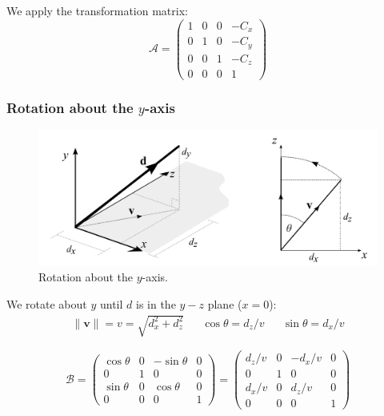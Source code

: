 \documentclass[11pt]{article}
\begin{document}
We apply the transformation matrix:
\[
  \mathcal{A} =
  \begin{pmatrix}
    1 & 0 & 0 & -C_x \\
    0 & 1 & 0 & -C_y \\
    0 & 0 & 1 & -C_z \\
    0 & 0 & 0 & 1
  \end{pmatrix}
\]

\subsubsection{Rotation about the $y$-axis}
\begin{figure}[htb!]
  \caption{Rotation about the $y$-axis.}
  \includegraphics[scale=0.2]{roty}
  \centering
\end{figure}

We rotate about $y$ until $d$ is in the $y-z$ plane ($x = 0$):
\begin{align*}
  \lVert \textbf{v} \lVert = v = \sqrt{d_x^2 + d_z^2} && \cos \theta = d_z / v && \sin \theta = d_x / v
\end{align*}

\[
  \mathcal{B} =
  \begin{pmatrix}
    \cos \theta & 0 & -\sin \theta & 0 \\
    0 & 1 & 0 & 0 \\
    \sin \theta & 0 & \cos \theta & 0 \\
    0 & 0 & 0 & 1
  \end{pmatrix}
  =
  \begin{pmatrix}
    d_z / v & 0 & -d_x / v & 0 \\
    0 & 1 & 0 & 0 \\
    d_x / v & 0 & d_z / v & 0 \\
    0 & 0 & 0 & 1
  \end{pmatrix}
\]
\end{document}
